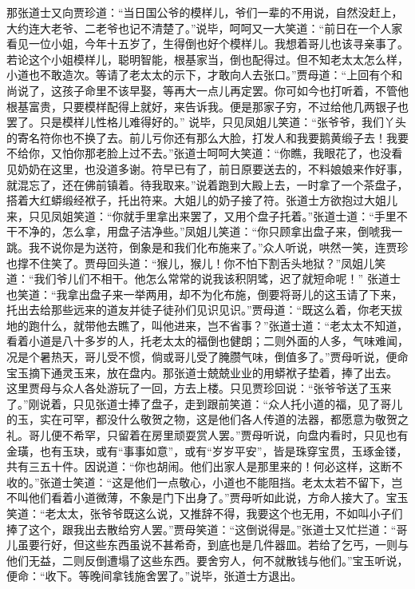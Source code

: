 \documentclass[12pt,oneside]{book}
\begin{document}
那张道士又向贾珍道：“当日国公爷的模样儿，爷们一辈的不用说，自然没赶上，大约连大老爷、二老爷也记不清楚了。”说毕，呵呵又一大笑道：“前日在一个人家看见一位小姐，今年十五岁了，生得倒也好个模样儿。我想着哥儿也该寻亲事了。若论这个小姐模样儿，聪明智能，根基家当，倒也配得过。但不知老太太怎么样，小道也不敢造次。等请了老太太的示下，才敢向人去张口。”贾母道：“上回有个和尚说了，这孩子命里不该早娶，等再大一点儿再定罢。你可如今也打听着，不管他根基富贵，只要模样配得上就好，来告诉我。便是那家子穷，不过给他几两银子也罢了。只是模样儿性格儿难得好的。”
说毕，只见凤姐儿笑道：“张爷爷，我们丫头的寄名符你也不换了去。前儿亏你还有那么大脸，打发人和我要鹅黄缎子去！我要不给你，又怕你那老脸上过不去。”张道士呵呵大笑道：“你瞧，我眼花了，也没看见奶奶在这里，也没道多谢。符早已有了，前日原要送去的，不料娘娘来作好事，就混忘了，还在佛前镇着。待我取来。”说着跑到大殿上去，一时拿了一个茶盘子，搭着大红蟒缎经袱子，托出符来。大姐儿的奶子接了符。张道士方欲抱过大姐儿来，只见凤姐笑道：“你就手里拿出来罢了，又用个盘子托着。”张道士道：“手里不干不净的，怎么拿，用盘子洁净些。”凤姐儿笑道：“你只顾拿出盘子来，倒唬我一跳。我不说你是为送符，倒象是和我们化布施来了。”众人听说，哄然一笑，连贾珍也撑不住笑了。贾母回头道：“猴儿，猴儿！你不怕下割舌头地狱？”凤姐儿笑道：“我们爷儿们不相干。他怎么常常的说我该积阴骘，迟了就短命呢！”
张道士也笑道：“我拿出盘子来一举两用，却不为化布施，倒要将哥儿的这玉请了下来，托出去给那些远来的道友并徒子徒孙们见识见识。”贾母道：“既这么着，你老天拔地的跑什么，就带他去瞧了，叫他进来，岂不省事？”张道士道：“老太太不知道，看着小道是八十多岁的人，托老太太的福倒也健朗；二则外面的人多，气味难闻，况是个暑热天，哥儿受不惯，倘或哥儿受了腌臜气味，倒值多了。”贾母听说，便命宝玉摘下通灵玉来，放在盘内。那张道士兢兢业业的用蟒袱子垫着，捧了出去。
这里贾母与众人各处游玩了一回，方去上楼。只见贾珍回说：“张爷爷送了玉来了。”刚说着，只见张道士捧了盘子，走到跟前笑道：“众人托小道的福，见了哥儿的玉，实在可罕，都没什么敬贺之物，这是他们各人传道的法器，都愿意为敬贺之礼。哥儿便不希罕，只留着在房里顽耍赏人罢。”贾母听说，向盘内看时，只见也有金璜，也有玉玦，或有“事事如意”，或有“岁岁平安”，皆是珠穿宝贯，玉琢金镂，共有三五十件。因说道：“你也胡闹。他们出家人是那里来的！何必这样，这断不收的。”张道士笑道：“这是他们一点敬心，小道也不能阻挡。老太太若不留下，岂不叫他们看着小道微薄，不象是门下出身了。”贾母听如此说，方命人接大了。宝玉笑道：“老太太，张爷爷既这么说，又推辞不得，我要这个也无用，不如叫小子们捧了这个，跟我出去散给穷人罢。”贾母笑道：“这倒说得是。”张道士又忙拦道：“哥儿虽要行好，但这些东西虽说不甚希奇，到底也是几件器皿。若给了乞丐，一则与他们无益，二则反倒遭塌了这些东西。要舍穷人，何不就散钱与他们。”宝玉听说，便命：“收下。等晚间拿钱施舍罢了。”说毕，张道士方退出。
\end{document}
